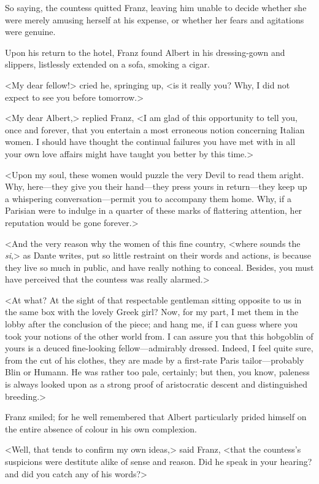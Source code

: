  So saying, the countess quitted Franz, leaving him unable to decide whether she were merely amusing herself at his expense, or whether her fears and agitations were genuine. 

 Upon his return to the hotel, Franz found Albert in his dressing-gown and slippers, listlessly extended on a sofa, smoking a cigar. 

 <My dear fellow!> cried he, springing up, <is it really you? Why, I did not expect to see you before tomorrow.> 

 <My dear Albert,> replied Franz, <I am glad of this opportunity to tell you, once and forever, that you entertain a most erroneous notion concerning Italian women. I should have thought the continual failures you have met with in all your own love affairs might have taught you better by this time.> 

 <Upon my soul, these women would puzzle the very Devil to read them aright. Why, here—they give you their hand—they press yours in return—they keep up a whispering conversation—permit you to accompany them home. Why, if a Parisian were to indulge in a quarter of these marks of flattering attention, her reputation would be gone forever.> 

 <And the very reason why the women of this fine country, <where sounds the \textit{si},> as Dante writes, put so little restraint on their words and actions, is because they live so much in public, and have really nothing to conceal. Besides, you must have perceived that the countess was really alarmed.> 

 <At what? At the sight of that respectable gentleman sitting opposite to us in the same box with the lovely Greek girl? Now, for my part, I met them in the lobby after the conclusion of the piece; and hang me, if I can guess where you took your notions of the other world from. I can assure you that this hobgoblin of yours is a deuced fine-looking fellow—admirably dressed. Indeed, I feel quite sure, from the cut of his clothes, they are made by a first-rate Paris tailor—probably Blin or Humann. He was rather too pale, certainly; but then, you know, paleness is always looked upon as a strong proof of aristocratic descent and distinguished breeding.> 

 Franz smiled; for he well remembered that Albert particularly prided himself on the entire absence of colour in his own complexion. 

 <Well, that tends to confirm my own ideas,> said Franz, <that the countess's suspicions were destitute alike of sense and reason. Did he speak in your hearing? and did you catch any of his words?> 

